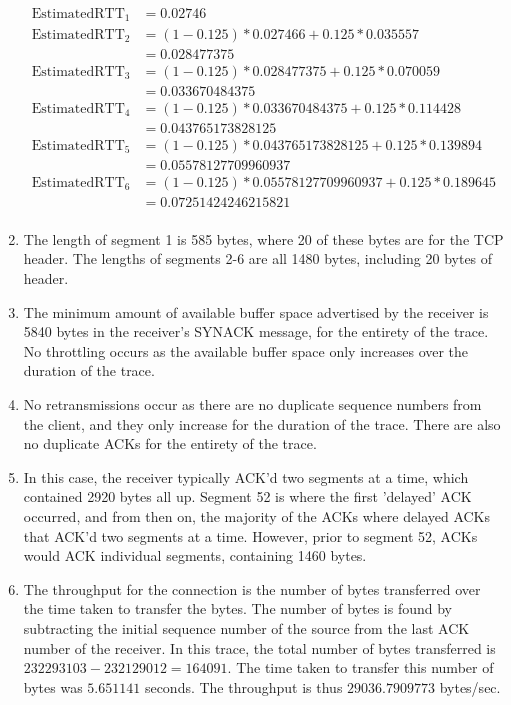 \documentclass[a4paper,11pt]{article}
\newcommand{\ds}{\displaystyle}
\begin{document}
\begin{enumerate}[leftmargin=*]
		\begin{align*}
			\text{EstimatedRTT}_1 &= 0.02746 \\
            \text{EstimatedRTT}_2 &= (1 - 0.125)*0.027466 + 0.125*0.035557 \\
								  &= 0.028477375 \\
            \text{EstimatedRTT}_3 &= (1 - 0.125)*0.028477375 + 0.125*0.070059 \\
								  &= 0.033670484375 \\
            \text{EstimatedRTT}_4 &= (1 - 0.125)*0.033670484375 + 0.125*0.114428 \\
								  &= 0.043765173828125 \\
            \text{EstimatedRTT}_5 &= (1 - 0.125)*0.043765173828125 + 0.125*0.139894 \\
								  &= 0.05578127709960937 \\
            \text{EstimatedRTT}_6 &= (1 - 0.125)*0.05578127709960937 + 0.125*0.189645 \\
								  &= 0.07251424246215821 \\
        \end{align*}

	\item The length of segment 1 is 585 bytes, where 20 of these bytes are for the TCP header. The lengths of segments 2-6 are all 1480 bytes, including 20 bytes of header.
	\item The minimum amount of available buffer space advertised by the receiver is 5840 bytes in the receiver's SYNACK message, for the entirety of the trace. No throttling occurs as the available buffer space only increases over the duration of the trace.
	\item No retransmissions occur as there are no duplicate sequence numbers from the client, and they only increase for the duration of the trace. There are also no duplicate ACKs for the entirety of the trace.
	\item In this case, the receiver typically ACK'd two segments at a time, which contained 2920 bytes all up. Segment 52 is where the first 'delayed' ACK occurred, and from then on, the majority of the ACKs where delayed ACKs that ACK'd two segments at a time. However, prior to segment 52, ACKs would ACK individual segments, containing 1460 bytes.
	\item The throughput for the connection is the number of bytes transferred over the time taken to transfer the bytes. The number of bytes is found by subtracting the initial sequence number of the source from the last ACK number of the receiver. In this trace, the total number of bytes transferred is $\ds{232293103-232129012 = 164091}$. The time taken to transfer this number of bytes was $\ds{5.651141}$ seconds. The throughput is thus $\ds{29036.7909773}$ bytes/sec. 
\end{enumerate}
\end{document}
